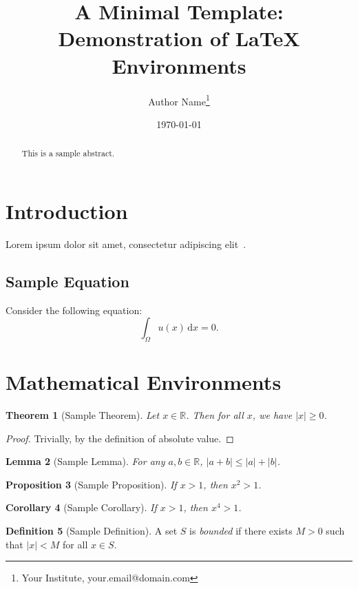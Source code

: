 \documentclass[11pt]{article}
\title{A Minimal Template: Demonstration of LaTeX Environments}
\author{Author Name\thanks{Your Institute, your.email@domain.com}}
\date{\today}
\newtheorem{theorem}{Theorem}[section]
\newtheorem{lemma}[theorem]{Lemma}
\newtheorem{proposition}[theorem]{Proposition}
\newtheorem{corollary}[theorem]{Corollary}
\theoremstyle{definition}
\newtheorem{definition}[theorem]{Definition}
\theoremstyle{italicremark}
\newcommand{\abs}[1]{\left\vert #1 \right\vert} %
\newcommand{\RR}{\mathbb{R}} %
\begin{document}
\maketitle

\begin{abstract}
This is a sample abstract. 
\end{abstract}

\section{Introduction}
Lorem ipsum dolor sit amet, consectetur adipiscing elit~\cite{DuEtAl2021MaximumBound}. 

\subsection{Sample Equation}
Consider the following equation:
\begin{equation}\label{eq:sample}
    \int_{\Omega} u(x) \, \mathrm{d}x = 0.
\end{equation}

\section{Mathematical Environments}

\begin{theorem}[Sample Theorem]\label{thm:sample}
Let $x \in \RR$. Then for all $x$, we have $\abs{x} \ge 0$.
\end{theorem}

\begin{proof}
Trivially, by the definition of absolute value.
\end{proof}

\begin{lemma}[Sample Lemma]\label{lem:sample}
For any $a, b \in \RR$, $\abs{a+b} \le \abs{a} + \abs{b}$.
\end{lemma}

\begin{proposition}[Sample Proposition]
If $x > 1$, then $x^2 > 1$.
\end{proposition}

\begin{corollary}[Sample Corollary]
If $x > 1$, then $x^4 > 1$.
\end{corollary}

\begin{definition}[Sample Definition]
A set $S$ is \emph{bounded} if there exists $M > 0$ such that $\abs{x} < M$ for all $x \in S$.
\end{definition}
\end{document}
